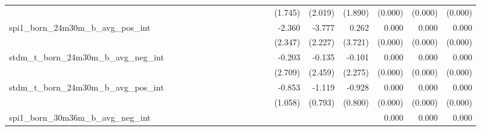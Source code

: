 \begin{tabular}{lrrrrrrrrrrrrrrrrrr}
                                            &              &              &              &              &              &              &              &              &               &              &              &               &      (1.745) &      (2.019) &       (1.890) &      (0.000) &      (0.000) &       (0.000) \\ 
spi1\_born\_24m30m\_b\_avg\_pos\_int        &              &              &              &              &              &              &              &              &               &              &              &               &       -2.360 &       -3.777 &         0.262 &        0.000 &        0.000 &         0.000 \\ 
                                            &              &              &              &              &              &              &              &              &               &              &              &               &      (2.347) &      (2.227) &       (3.721) &      (0.000) &      (0.000) &       (0.000) \\ 
stdm\_t\_born\_24m30m\_b\_avg\_neg\_int     &              &              &              &              &              &              &              &              &               &              &              &               &       -0.203 &       -0.135 &        -0.101 &        0.000 &        0.000 &         0.000 \\ 
                                            &              &              &              &              &              &              &              &              &               &              &              &               &      (2.709) &      (2.459) &       (2.275) &      (0.000) &      (0.000) &       (0.000) \\ 
stdm\_t\_born\_24m30m\_b\_avg\_pos\_int     &              &              &              &              &              &              &              &              &               &              &              &               &       -0.853 &       -1.119 &        -0.928 &        0.000 &        0.000 &         0.000 \\ 
                                            &              &              &              &              &              &              &              &              &               &              &              &               &      (1.058) &      (0.793) &       (0.800) &      (0.000) &      (0.000) &       (0.000) \\ 
spi1\_born\_30m36m\_b\_avg\_neg\_int        &              &              &              &              &              &              &              &              &               &              &              &               &              &              &               &        0.000 &        0.000 &         0.000 \\ 

\end{tabular}
